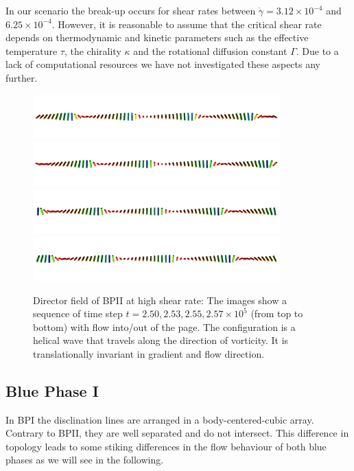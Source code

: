 \documentclass[aps,pre,reprint,superscriptaddress]{revtex4}
\newcommand{\e}[1]{\times10^{#1}}
\newcommand{\gd}{\dot{\gamma}}
\begin{document}
In our scenario the break-up occurs for shear rates between $\gd=3.12\e{-4}$ and $6.25\e{-4}$.
However, it is reasonable to assume that the critical shear rate depends on thermodynamic and kinetic parameters
such as the effective temperature $\tau$, the chirality $\kappa$ and the rotational diffusion constant $\Gamma$.
Due to a lack of computational resources we have not investigated these aspects any further.

\begin{figure}[h]
\includegraphics[width=0.85\textwidth]{dir+y-250k_run949.png}
\includegraphics[width=0.85\textwidth]{dir+y-253k_run949.png}
\includegraphics[width=0.85\textwidth]{dir+y-255k_run949.png}
\includegraphics[width=0.85\textwidth]{dir+y-257k_run949.png}
\caption{Director field of BPII at high shear rate: The images show a sequence of time step $t=2.50, 2.53,2.55, 2.57\e{5}$ (from top to bottom) with flow into/out of the page. The configuration is a helical wave that travels along the direction of vorticity. It is translationally invariant in gradient and flow direction.}
\label{bp2-high}
\end{figure}
\clearpage

\subsection{Blue Phase I}

In BPI the disclination lines are arranged in a body-centered-cubic array.
Contrary to BPII, they are well separated and do not intersect. 
This difference in topology leads to some stiking differences in the flow behaviour of both blue phases 
as we will see in the following.
\end{document}
